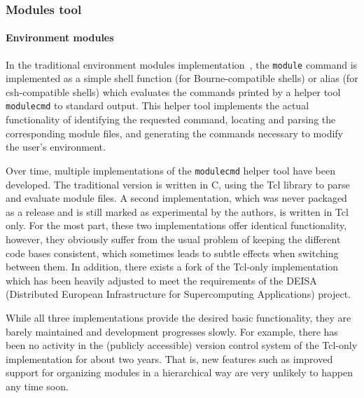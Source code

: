 
\subsubsection{Modules tool}

\paragraph{Environment modules}

In the traditional environment modules
implementation~\cite{environment_modules_paper}, the \texttt{module} command
is implemented as a simple shell function (for Bourne-compatible shells) or
alias (for csh-compatible shells) which evaluates the commands printed by a
helper tool \texttt{modulecmd} to standard output. This helper tool
implements the actual functionality of identifying the requested command,
locating and parsing the corresponding module files, and generating the
commands necessary to modify the user's environment.

Over time, multiple implementations of the \texttt{modulecmd} helper tool
have been developed. The traditional version is written in C, using the Tcl
library to parse and evaluate module files. A second implementation, which
was never packaged as a release and is still marked as experimental by the
authors, is written in Tcl only. For the most part, these two implementations
offer identical functionality, however, they obviously suffer from the usual
problem of keeping the different code bases consistent, which sometimes leads
to subtle effects when switching between them. In addition, there exists a
fork of the Tcl-only implementation which has been heavily adjusted to meet
the requirements of the DEISA (Distributed European Infrastructure for
Supercomputing Applications) project.


While all three implementations provide the desired basic functionality, they
are barely maintained and development progresses slowly. For example, there
has been no activity in the (publicly accessible) version control system of
the Tcl-only implementation for about two years. That is, new features such
as improved support for organizing modules in a hierarchical way are very
unlikely to happen any time soon.


